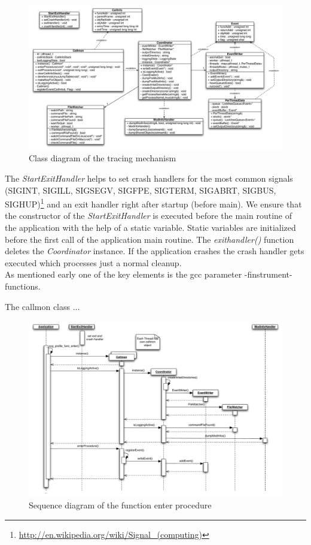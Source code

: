 \begin{figure}[ht]
\centering
\includegraphics[width=18cm]{images/callmon_class_diagram}
\caption{Class diagram of the tracing mechanism}\label{fig:figure1}
\end{figure}

The \emph{StartExitHandler} helps to set crash handlers for the most common signals (SIGINT, SIGILL, SIGSEGV, SIGFPE, SIGTERM, SIGABRT, SIGBUS, SIGHUP)\footnote{\url{http://en.wikipedia.org/wiki/Signal_(computing)}} and an exit handler right after startup (before main). We ensure that the constructor of the \emph{StartExitHandler} is executed before the main routine of the application with the help of a static variable. Static variables are initialized before the first call of the application main routine. The \emph{exithandler()} function deletes the \emph{Coordinator} instance. If the application crashes the crash handler gets executed which processes just a normal cleanup.\\

As mentioned early one of the key elements is the gcc parameter -finstrument-functions. 

The callmon class ... 

\begin{figure}[ht]
\centering
\includegraphics[width=18cm]{images/callmon_sequence_diagram}
\caption{Sequence diagram of the function enter procedure}
\end{figure}



